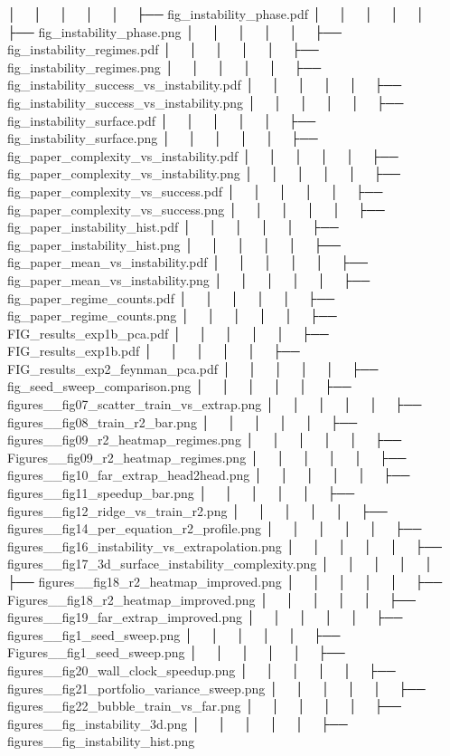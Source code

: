 │   │       │   │   │   ├── fig_instability_phase.pdf
│   │       │   │   │   ├── fig_instability_phase.png
│   │       │   │   │   ├── fig_instability_regimes.pdf
│   │       │   │   │   ├── fig_instability_regimes.png
│   │       │   │   │   ├── fig_instability_success_vs_instability.pdf
│   │       │   │   │   ├── fig_instability_success_vs_instability.png
│   │       │   │   │   ├── fig_instability_surface.pdf
│   │       │   │   │   ├── fig_instability_surface.png
│   │       │   │   │   ├── fig_paper_complexity_vs_instability.pdf
│   │       │   │   │   ├── fig_paper_complexity_vs_instability.png
│   │       │   │   │   ├── fig_paper_complexity_vs_success.pdf
│   │       │   │   │   ├── fig_paper_complexity_vs_success.png
│   │       │   │   │   ├── fig_paper_instability_hist.pdf
│   │       │   │   │   ├── fig_paper_instability_hist.png
│   │       │   │   │   ├── fig_paper_mean_vs_instability.pdf
│   │       │   │   │   ├── fig_paper_mean_vs_instability.png
│   │       │   │   │   ├── fig_paper_regime_counts.pdf
│   │       │   │   │   ├── fig_paper_regime_counts.png
│   │       │   │   │   ├── FIG_results_exp1b_pca.pdf
│   │       │   │   │   ├── FIG_results_exp1b.pdf
│   │       │   │   │   ├── FIG_results_exp2_feynman_pca.pdf
│   │       │   │   │   ├── fig_seed_sweep_comparison.png
│   │       │   │   │   ├── figures__fig07_scatter_train_vs_extrap.png
│   │       │   │   │   ├── figures__fig08_train_r2_bar.png
│   │       │   │   │   ├── figures__fig09_r2_heatmap_regimes.png
│   │       │   │   │   ├── Figures__fig09_r2_heatmap_regimes.png
│   │       │   │   │   ├── figures__fig10_far_extrap_head2head.png
│   │       │   │   │   ├── figures__fig11_speedup_bar.png
│   │       │   │   │   ├── figures__fig12_ridge_vs_train_r2.png
│   │       │   │   │   ├── figures__fig14_per_equation_r2_profile.png
│   │       │   │   │   ├── figures__fig16_instability_vs_extrapolation.png
│   │       │   │   │   ├── figures__fig17_3d_surface_instability_complexity.png
│   │       │   │   │   ├── figures__fig18_r2_heatmap_improved.png
│   │       │   │   │   ├── Figures__fig18_r2_heatmap_improved.png
│   │       │   │   │   ├── figures__fig19_far_extrap_improved.png
│   │       │   │   │   ├── figures__fig1_seed_sweep.png
│   │       │   │   │   ├── Figures__fig1_seed_sweep.png
│   │       │   │   │   ├── figures__fig20_wall_clock_speedup.png
│   │       │   │   │   ├── figures__fig21_portfolio_variance_sweep.png
│   │       │   │   │   ├── figures__fig22_bubble_train_vs_far.png
│   │       │   │   │   ├── figures__fig_instability_3d.png
│   │       │   │   │   ├── figures__fig_instability_hist.png
